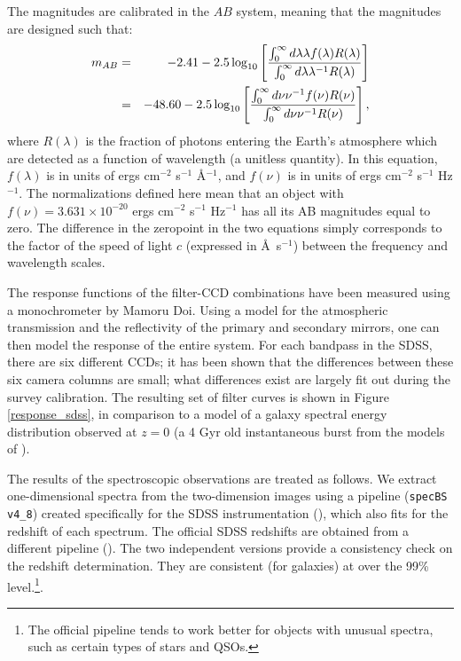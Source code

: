 \documentclass[10pt,preprint]{aastex}
\begin{document}
The magnitudes are calibrated in the $AB$ system, meaning that the
magnitudes are designed such that:
\begin{eqnarray}
\label{ABdef}
m_{AB} &=& -2.41 - 2.5 \log_{10}\left[
\frac{\int_{0}^{\infty} d\lambda \lambda f(\lambda) R(\lambda)}
{\int_{0}^{\infty} d\lambda \lambda^{-1} R(\lambda)}\right]
\cr
&=& -48.60 - 2.5 \log_{10}\left[
\frac{\int_{0}^{\infty} d\nu \nu^{-1} f(\nu) R(\nu)}
{\int_{0}^{\infty} d\nu \nu^{-1} R(\nu)}\right],
\end{eqnarray}
where $R(\lambda)$ is the fraction of photons entering the Earth's
atmosphere which are detected as a function of wavelength (a unitless
quantity). In this equation, $f(\lambda)$ is in units of ergs
cm$^{-2}$ s$^{-1}$ \AA$^{-1}$, and $f(\nu)$ is in units of ergs
cm$^{-2}$ s$^{-1}$ Hz$^{-1}$. The normalizations defined here mean
that an object with $f(\nu) = 3.631 \times 10^{-20}$ ergs cm$^{-2}$
s$^{-1}$ Hz$^{-1}$ has all its AB magnitudes equal to zero.  The
difference in the zeropoint in the two equations simply corresponds to
the factor of the speed of light $c$ (expressed in \AA\ s$^{-1}$)
between the frequency and wavelength scales.

The response functions of the filter-CCD combinations have been
measured using a monochrometer by Mamoru Doi.  Using a model
for the atmospheric transmission and the reflectivity of the primary
and secondary mirrors, one can then model the response of the entire
system. For each bandpass in the SDSS, there are six different CCDs;
it has been shown that the differences between these six camera
columns are small; what differences exist are largely fit out during
the survey calibration. The resulting set of filter curves is shown in
Figure \ref{response_sdss}, in comparison to a model of a galaxy
spectral energy distribution observed at $z=0$ (a 4 Gyr old
instantaneous burst from the models of \citealt{bruzual93a}).

The results of the spectroscopic observations are treated as follows.
We extract one-dimensional spectra from the two-dimension images using
a pipeline ({\tt specBS v4\_8}) created specifically for the SDSS
instrumentation (\citealt{schlegel02a}), which also fits for the
redshift of each spectrum. The official SDSS redshifts are obtained
from a different pipeline (\citealt{subbarao02a}). The two independent
versions provide a consistency check on the redshift
determination. They are consistent (for galaxies) at over the 99\%
level.\footnote{The official pipeline tends to work better for objects
with unusual spectra, such as certain types of stars and QSOs.}.
\end{document}
